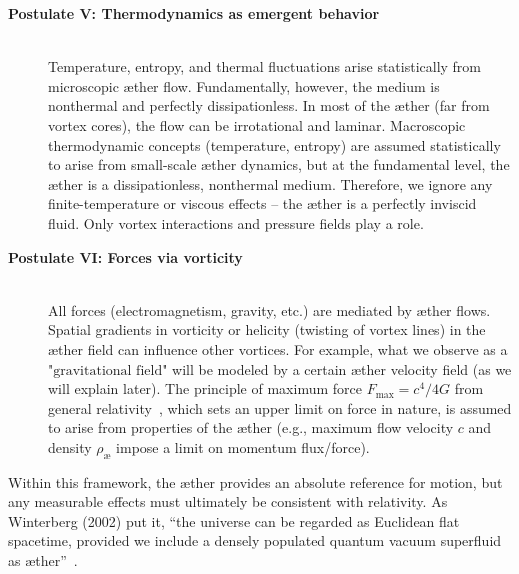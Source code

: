 \begin{description}
    \item[\textbf{Postulate V: Thermodynamics as emergent behavior}] \hfill \\
    Temperature, entropy, and thermal fluctuations arise statistically from microscopic æther flow. Fundamentally, however, the medium is nonthermal and perfectly dissipationless. In most of the æther (far from vortex cores), the flow can be irrotational and laminar. Macroscopic thermodynamic concepts (temperature, entropy) are assumed statistically to arise from small-scale æther dynamics, but at the fundamental level, the æther is a dissipationless, nonthermal medium. Therefore, we ignore any finite-temperature or viscous effects – the æther is a perfectly inviscid fluid. Only vortex interactions and pressure fields play a role.

    \item[\textbf{Postulate VI: Forces via vorticity}] \hfill \\
    All forces (electromagnetism, gravity, etc.) are mediated by æther flows.
    Spatial gradients in vorticity or helicity (twisting of vortex lines) in the æther field can influence other vortices. For example, what we observe as a $\text{"gravitational field"}$ will be modeled by a certain æther velocity field (as we will explain later). The principle of maximum force $ F_\text{max} = c^4 / 4 G $ from general relativity~\cite{Schiller2022-maxforce}, which sets an upper limit on force in nature, is assumed to arise from properties of the æther (e.g., maximum flow velocity $c$ and density $\rho_\text{\ae}$ impose a limit on momentum flux/force).
\end{description}

Within this framework, the æther provides an absolute reference for motion, but any measurable effects must ultimately be consistent with relativity. As Winterberg (2002) put it, ``the universe can be regarded as Euclidean flat spacetime, provided we include a densely populated quantum vacuum superfluid as æther''~\cite{Winterberg2002-PlanckÆther}.


